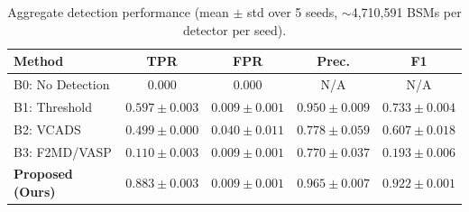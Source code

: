 \begin{table}[t]
\centering
\caption{Aggregate detection performance (mean $\pm$ std over 5 seeds, ${\sim}$4,710,591 BSMs per detector per seed).}
\label{tab:comparison}
\small
\begin{tabular}{l|cccc}
\hline
\textbf{Method} & \textbf{TPR} & \textbf{FPR} & \textbf{Prec.} & \textbf{F1} \\
\hline
B0: No Detection & 0.000 & 0.000 & N/A & N/A \\
B1: Threshold & $0.597 \pm 0.003$ & $0.009 \pm 0.001$ & $0.950 \pm 0.009$ & $0.733 \pm 0.004$ \\
B2: VCADS & $0.499 \pm 0.000$ & $0.040 \pm 0.011$ & $0.778 \pm 0.059$ & $0.607 \pm 0.018$ \\
B3: F2MD/VASP & $0.110 \pm 0.003$ & $0.009 \pm 0.001$ & $0.770 \pm 0.037$ & $0.193 \pm 0.006$ \\
\textbf{Proposed (Ours)} & $\mathbf{0.883 \pm 0.003}$ & $\mathbf{0.009 \pm 0.001}$ & $\mathbf{0.965 \pm 0.007}$ & $\mathbf{0.922 \pm 0.001}$ \\
\hline
\end{tabular}%
\end{table}